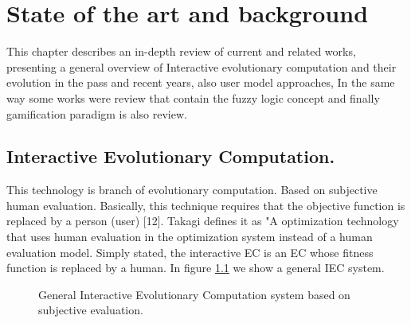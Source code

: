 \chapter{State of the art and background} \label{}
This chapter describes an in-depth review
of current and related works, presenting a general
overview of Interactive evolutionary computation and their evolution in the pass and recent years, also user model approaches, In the same way some works were review that contain the fuzzy logic concept and finally gamification paradigm is also review.


\section{Interactive Evolutionary Computation.} 

This technology is branch of evolutionary computation. Based on subjective human evaluation. Basically, this technique requires that the objective function is replaced by a person (user) [12]. Takagi defines it as "A optimization technology that uses human evaluation in the optimization system
instead of a human evaluation model. Simply stated, the interactive EC is an 
EC whose fitness function is replaced by a human.  In figure \ref{fig:IEC} we show a general IEC system.

\begin{figure}
	\captionsetup{justification=centering,margin=2cm}
	\centering
	\setlength\fboxsep{0pt}
	\setlength\fboxrule{0.7pt}
	\caption{ General Interactive Evolutionary Computation system based on subjective evaluation.}
	\label{fig:IEC}       
\end{figure}



